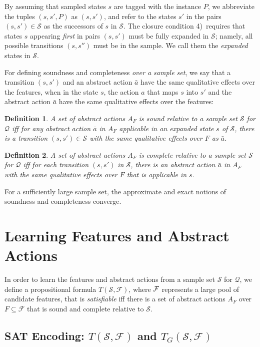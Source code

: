 \documentclass[letterpaper]{article} %
\newtheorem{definition}{Definition}
\newcommand{\Q}{\mathcal{Q}}
\newcommand{\F}{\mathcal{F}}
\renewcommand{\S}{\mathcal{S}}
\begin{document}
By assuming that sampled states $s$ are tagged with the instance $P$, 
we abbreviate the tuples $(s,s',P)$ as $(s,s')$, and refer to the
states $s'$ in  the pairs $(s,s') \in \S$ as the successors of
$s$ in $\S$. The  closure condition 4)~requires that
states $s$ appearing \emph{first} in pairs $(s,s')$ must be fully expanded in $\S$;
namely, all possible transitions $(s,s'')$ must be  in the sample. We call them
the \emph{expanded} states in $\S$.

For defining soundness and completeness \emph{over a sample set}, we say that  a transition $(s,s')$ and an abstract action $\bar{a}$
have  the same qualitative effects over the features,   when in the  state $s$,  the action $a$ that maps $s$ into $s'$ and the abstract action
$\bar{a}$ have the same qualitative effects over the features:

\begin{definition}
  A set of abstract actions $A_F$ is sound \emph{relative to a  sample set} $\S$ for $\Q$
  iff for  any  abstract action $\bar{a}$ in $A_F$ applicable in an expanded state $s$ of $\S$,
  there is a transition $(s,s') \in \S$ with the same qualitative  effects over $F$ as $\bar{a}$.
\end{definition}

\begin{definition}
  A set of abstract actions $A_F$ is complete   \emph{relative to a sample set} $\S$ for $\Q$
  iff for each transition  $(s,s')$ in  $\S$, there is an abstract action $\bar{a}$ in $A_F$
  with the same qualitative effects over $F$ that is applicable in $s$.
\end{definition}

For a sufficiently large sample set, the approximate and exact notions of soundness and completeness   converge.


\section{Learning Features and Abstract Actions}

In order to learn the features and abstract actions from a sample set $\S$ for $\Q$, 
we define a propositional formula $T(\S,\F)$, where  $\cal F$ represents a large
pool of candidate features, that is \emph{satisfiable} iff there is
a set of abstract actions $A_F$ over  $F \subseteq \F$ that is sound and complete
relative to $\S$. 

\subsection{SAT Encoding: $T(\S,\F)$ and $T_G(\S,\F)$}
\end{document}

